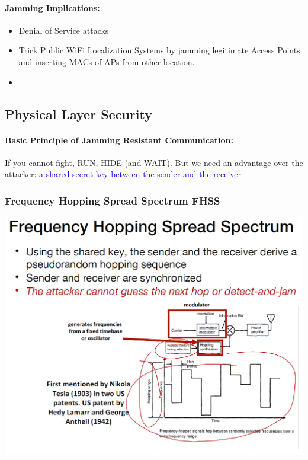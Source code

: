 \paragraph{Jamming Implications:} 
\begin{itemize}
    \item Denial of Service attacks
    \item Trick Public WiFi Localization Systems by jamming legitimate Access Points and inserting MACs of APs from other location.
    \item
\end{itemize}

\subsection{Physical Layer Security}

\paragraph{Basic Principle of Jamming Resistant Communication:} If you cannot fight, RUN, HIDE (and WAIT). But we need an advantage over the attacker: \textcolor{blue}{a shared secret key between the sender and the receiver}

\subsubsection{Frequency Hopping Spread Spectrum FHSS}
\begin{minipage}{\linewidth}
    \centering      
    \includegraphics[width=\linewidth]{Figures/L2_frequency_hopping.PNG} 
\end{minipage}

